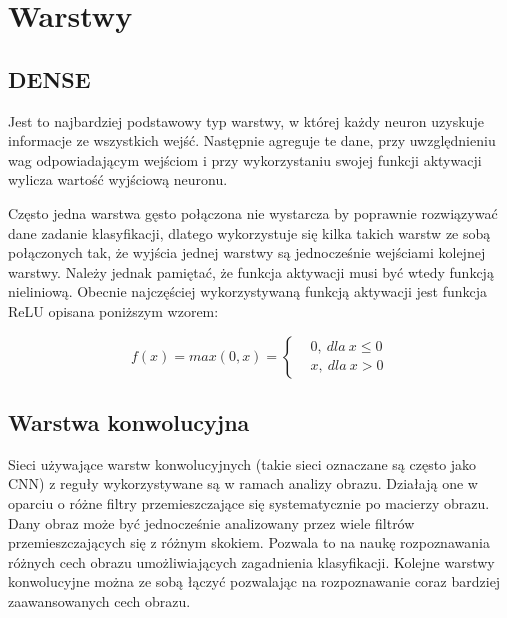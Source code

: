 \newpage %
\section{Warstwy}

\subsection{DENSE}



Jest to najbardziej podstawowy typ warstwy, w której każdy neuron uzyskuje informacje ze wszystkich wejść. Następnie agreguje te dane, przy uwzględnieniu wag odpowiadającym wejściom i przy wykorzystaniu swojej funkcji aktywacji wylicza wartość wyjściową neuronu. 

Często jedna warstwa gęsto połączona nie wystarcza by poprawnie rozwiązywać dane zadanie klasyfikacji, dlatego wykorzystuje się kilka takich warstw ze sobą połączonych tak, że wyjścia jednej warstwy są jednocześnie wejściami kolejnej warstwy. Należy jednak pamiętać, że funkcja aktywacji musi być wtedy funkcją nieliniową. Obecnie najczęściej wykorzystywaną funkcją aktywacji jest funkcja ReLU opisana poniższym wzorem: 

$$f(x) = max(0,x) = \left\{\begin{matrix}
         & 0,\ dla\ x \leq 0 \\
         & x,\ dla\ x > 0
    \end{matrix}\right.
$$

\subsection{Warstwa konwolucyjna}



Sieci używające warstw konwolucyjnych (takie sieci oznaczane są często jako CNN) z reguły wykorzystywane są w ramach analizy obrazu. Działają one w oparciu o różne filtry przemieszczające się systematycznie po macierzy obrazu. Dany obraz może być jednocześnie analizowany przez wiele filtrów przemieszczających się z różnym skokiem. Pozwala to na naukę rozpoznawania różnych cech obrazu umożliwiających zagadnienia klasyfikacji. Kolejne warstwy konwolucyjne można ze sobą łączyć pozwalając na rozpoznawanie coraz bardziej zaawansowanych cech obrazu.

